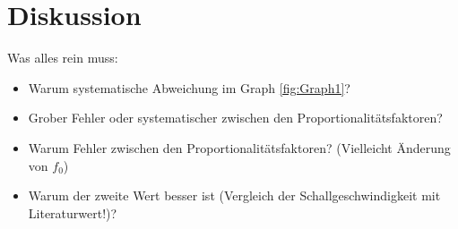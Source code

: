 
\section{Diskussion}
\label{sec:Diskussion}

Was alles rein muss:
\begin{itemize}
	\item Warum systematische Abweichung im Graph \ref{fig:Graph1}?
	\item Grober Fehler oder systematischer zwischen den Proportionalitätsfaktoren?
	\item Warum Fehler zwischen den Proportionalitätsfaktoren? (Vielleicht Änderung von $f_0$)
	\item Warum der zweite Wert besser ist (Vergleich der Schallgeschwindigkeit mit Literaturwert!)?
	
\end{itemize}